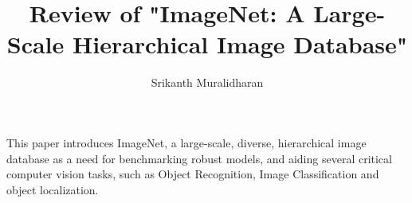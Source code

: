 \documentclass[]{article}
\title{Review of "ImageNet: A Large-Scale Hierarchical Image Database"}
\author{Srikanth Muralidharan}
\begin{document}
\maketitle

This paper introduces ImageNet, a large-scale, diverse, hierarchical image database as a need for benchmarking robust models, and aiding several critical computer vision tasks, 
such as Object Recognition, Image Classification and object localization.
\end{document}
